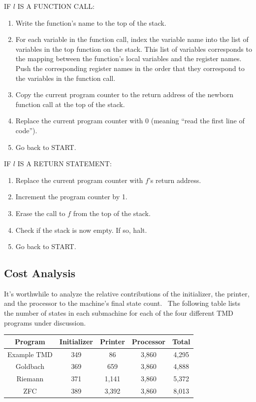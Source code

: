 \documentclass[11pt]{article}
\newcommand{\statenum}{8,013 }
\newcommand{\gbstatenum}{4,888 }
\newcommand{\rmstatenum}{5,372 }
\begin{document}
\noindent IF $l$ IS A FUNCTION CALL:
\begin{enumerate}
\item Write the function's name to the top of the stack.
\item For each variable in the function call, index the variable name into the list of variables in the top function on the stack. This list of variables corresponds to the mapping between the function's local variables and the register names. Push the corresponding register names in the order that they correspond to the variables in the function call.
\item Copy the current program counter to the return address of the newborn function call at the top of the stack.
\item Replace the current program counter with 0 (meaning ``read the first line of code'').
\item Go back to START.
\end{enumerate}

\noindent IF $l$ IS A RETURN STATEMENT:
\begin{enumerate}
\item Replace the current program counter with $f$'s return address.
\item Increment the program counter by 1.
\item Erase the call to $f$ from the top of the stack.
\item Check if the stack is now empty. If so, halt.
\item Go back to START.
\end{enumerate}

\subsection{Cost Analysis} \label{sec:cost}

It's worthwhile to analyze the relative contributions of the initializer, the printer, and the processor to the machine's final state count. \ The following table lists the number of states in each submachine for each of the four different TMD programs under discussion.

\begin{center}
    \begin{tabular}{||c c c c c||}
    \hline
    Program & Initializer & Printer & Processor & Total \\ [0.5ex]
    \hline\hline
    Example TMD & 349 & 86 & 3,860 & 4,295 \\
    \hline
    Goldbach & 369 & 659 & 3,860 & \gbstatenum \\
    \hline
    Riemann & 371 & 1,141 & 3,860 & \rmstatenum \\
    \hline
    ZFC & 389 & 3,392 & 3,860 & \statenum \\
    \hline
    \end{tabular}
\end{center}
\end{document}
